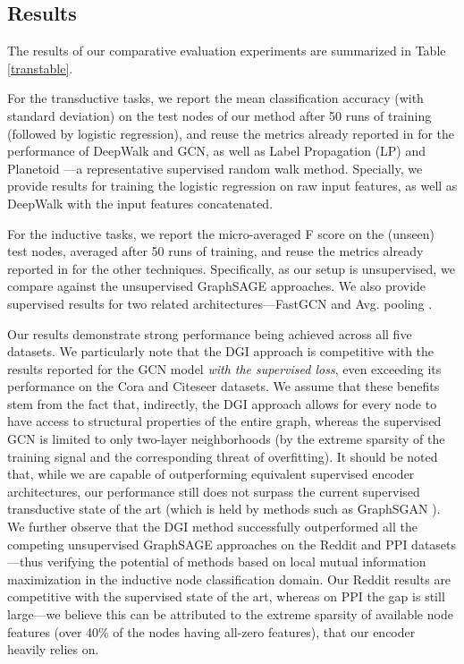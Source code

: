\documentclass{article} \usepackage{iclr2019_conference,times}
\begin{document}
\subsection{Results}
The results of our comparative evaluation experiments are summarized in Table \ref{transtable}. 

For the transductive tasks, we report the mean classification accuracy (with standard deviation) on the test nodes of our method after 50 runs of training (followed by logistic regression), and reuse the metrics already reported in \cite{kipf2016semi} for the performance of DeepWalk and GCN, as well as Label Propagation (LP) \citep{zhu2003semi} and Planetoid \citep{yang2016revisiting}---a representative supervised random walk method. Specially, we provide results for training the logistic regression on raw input features, as well as DeepWalk with the input features concatenated. 

For the inductive tasks, we report the micro-averaged F score on the (unseen) test nodes, averaged after 50 runs of training, and reuse the metrics already reported in \cite{hamilton2017inductive} for the other techniques. Specifically, as our setup is unsupervised, we compare against the unsupervised GraphSAGE approaches. We also provide supervised results for two related architectures---FastGCN \citep{chen2018fastgcn} and Avg. pooling \citep{zhang2018gaan}.

Our results demonstrate strong performance being achieved across all five datasets. We particularly note that the DGI approach is competitive with the results reported for the GCN model \emph{with the supervised loss}, even exceeding its performance on the Cora and Citeseer datasets. We assume that these benefits stem from the fact that, indirectly, the DGI approach allows for every node to have access to structural properties of the entire graph, whereas the supervised GCN is limited to only two-layer neighborhoods (by the extreme sparsity of the training signal and the corresponding threat of overfitting). It should be noted that, while we are capable of outperforming equivalent supervised encoder architectures, our performance still does not surpass the current supervised transductive state of the art (which is held by methods such as GraphSGAN \citep{ding2018semi}). We further observe that the DGI method successfully outperformed all the competing unsupervised GraphSAGE approaches on the Reddit and PPI datasets---thus verifying the potential of methods based on local mutual information maximization in the inductive node classification domain. Our Reddit results are competitive with the supervised state of the art, whereas on PPI the gap is still large---we believe this can be attributed to the extreme sparsity of available node features (over 40\% of the nodes having all-zero features), that our encoder heavily relies on.
\end{document}
